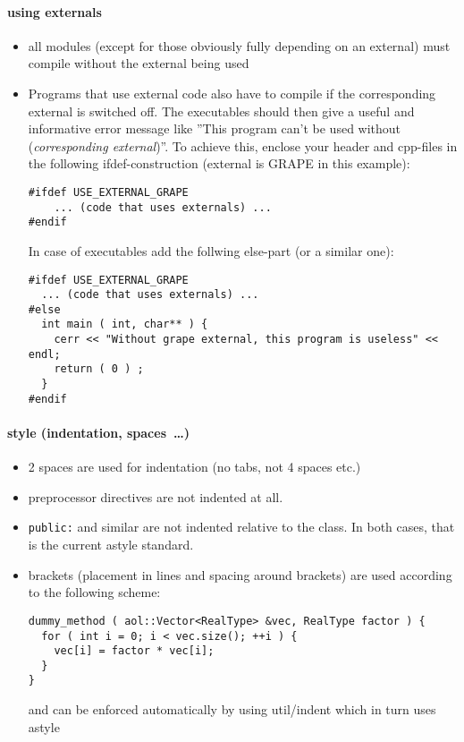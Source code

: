 \paragraph{using externals}
\begin{itemize}
\item all modules (except for those obviously fully depending on an
  external) must compile without the external being used
\item Programs that use external code also have to compile if the
  corresponding external is switched off. The executables should then
  give a useful and informative error message like ''This program
  can't be used without ({\it corresponding external})''. To achieve
  this, enclose your header and cpp-files in the following
  ifdef-construction (external is GRAPE in this example):
\begin{verbatim}
#ifdef USE_EXTERNAL_GRAPE
    ... (code that uses externals) ...
#endif
\end{verbatim}
In case of executables add the follwing else-part (or a similar one):
\begin{verbatim}
#ifdef USE_EXTERNAL_GRAPE
  ... (code that uses externals) ...
#else
  int main ( int, char** ) {
    cerr << "Without grape external, this program is useless" << endl;
    return ( 0 ) ;
  }
#endif
\end{verbatim}
\end{itemize}


\paragraph{style (indentation, spaces~\ldots)}

\begin{itemize}
    \item 2 spaces are used for indentation (no tabs, not 4 spaces etc.)
    \item preprocessor directives are not indented at all.
    \item \texttt{public:} and similar are not indented relative to the class.
          In both cases, that is the current astyle standard.
    \item brackets (placement in lines and spacing around brackets) are used according to the following scheme:
          \begin{verbatim}
dummy_method ( aol::Vector<RealType> &vec, RealType factor ) {
  for ( int i = 0; i < vec.size(); ++i ) {
    vec[i] = factor * vec[i];
  }
}              \end{verbatim}
          and can be enforced automatically by using util/indent which in turn uses astyle
\end{itemize}


